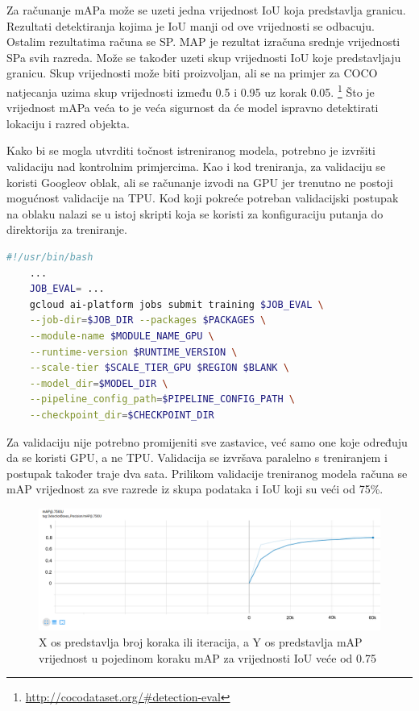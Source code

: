 Za računanje mAPa može se uzeti jedna vrijednost IoU koja predstavlja granicu. Rezultati detektiranja kojima je IoU manji od ove vrijednosti se odbacuju.
Ostalim rezultatima računa se SP. MAP je rezultat izračuna srednje vrijednosti SPa svih razreda. Može se također uzeti skup vrijednosti IoU koje predstavljaju granicu. 
Skup vrijednosti može biti proizvoljan, ali se na primjer za COCO natjecanja uzima skup vrijednosti između 0.5 i 0.95 uz korak 0.05. \footnote{\url{http://cocodataset.org/\#detection-eval}}
Što je vrijednost mAPa veća to je veća sigurnost da će model ispravno detektirati lokaciju i razred objekta. 

Kako bi se mogla utvrditi točnost istreniranog modela, potrebno je izvršiti validaciju nad kontrolnim primjercima. Kao i kod treniranja, za validaciju se koristi Googleov oblak, ali se računanje izvodi
na GPU jer trenutno ne postoji mogućnost validacije na TPU. Kod koji pokreće potreban validacijski postupak na oblaku nalazi se u istoj skripti koja se koristi za konfiguraciju putanja do direktorija za treniranje.

\begin{lstlisting}[language=bash, tabsize=2]
    #!/usr/bin/bash
    ...
    JOB_EVAL= ...
    gcloud ai-platform jobs submit training $JOB_EVAL \
    --job-dir=$JOB_DIR --packages $PACKAGES \
    --module-name $MODULE_NAME_GPU \
    --runtime-version $RUNTIME_VERSION \
    --scale-tier $SCALE_TIER_GPU $REGION $BLANK \
    --model_dir=$MODEL_DIR \
    --pipeline_config_path=$PIPELINE_CONFIG_PATH \
    --checkpoint_dir=$CHECKPOINT_DIR
\end{lstlisting}

Za validaciju nije potrebno promijeniti sve zastavice, već samo one koje određuju da se koristi GPU, a ne TPU. Validacija se izvršava paralelno s treniranjem i postupak također traje dva sata.
Prilikom validacije treniranog modela računa se mAP vrijednost za sve razrede iz skupa podataka i IoU koji su veći od 75\%. \newline

\begin{figure}[htb]
    \centering
    \includegraphics[width=14cm]{img/eval-mAP.png}
    \caption{X os predstavlja broj koraka ili iteracija, a Y os predstavlja mAP vrijednost u pojedinom koraku mAP za vrijednosti IoU veće od 0.75}
    \label{Eval-mAP}
\end{figure}

